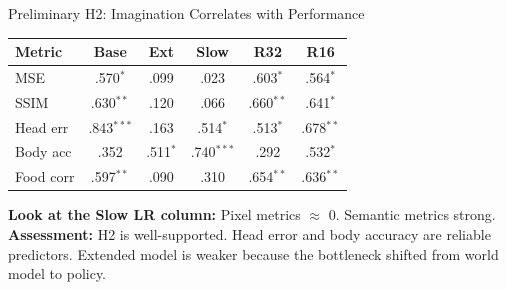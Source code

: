 \documentclass[aspectratio=169]{beamer}
\begin{document}
\begin{frame}{Preliminary H2: Imagination Correlates with Performance}

\begin{table}
\centering
\small
\begin{tabular}{lccccc}
\toprule
\textbf{Metric} & \textbf{Base} & \textbf{Ext} & \textbf{Slow} & \textbf{R32} & \textbf{R16} \\
\midrule
MSE              & .570$^{*}$  & .099 & .023 & .603$^{*}$  & .564$^{*}$  \\
SSIM             & .630$^{**}$ & .120 & .066 & .660$^{**}$ & .641$^{*}$  \\
Head err         & .843$^{***}$& .163 & .514$^{*}$  & .513$^{*}$  & .678$^{**}$ \\
Body acc         & .352        & .511$^{*}$  & .740$^{***}$& .292 & .532$^{*}$  \\
Food corr        & .597$^{**}$ & .090 & .310 & .654$^{**}$ & .636$^{**}$ \\
\bottomrule
\end{tabular}
\end{table}

\textbf{Look at the Slow LR column:} Pixel metrics $\approx$ 0. Semantic metrics strong.\\[0.3em]
\textbf{Assessment:} H2 is well-supported. Head error and body accuracy are reliable predictors. Extended model is weaker because the bottleneck shifted from world model to policy.
\end{frame}
\end{document}
